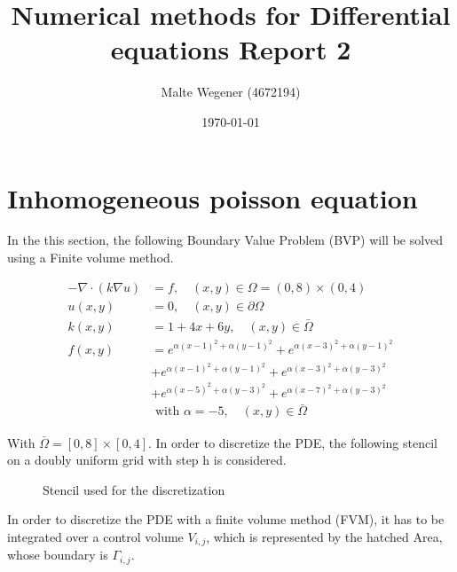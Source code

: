 \documentclass{article}
\title{Numerical methods for Differential equations Report 2}
\author{Malte Wegener (4672194)}
\date{\today}
\begin{document}
\maketitle
\section{Inhomogeneous poisson equation}
In the this section, the following Boundary Value Problem (BVP) will be solved using a Finite volume method.

\begin{equation}
\begin{aligned}-\nabla \cdot(k \nabla u) &=f, \quad(x, y) \in \Omega=(0,8) \times(0,4) \\ u(x, y) &=0, \quad(x, y) \in \partial \Omega \\ k(x, y) &=1+4 x+6 y, \quad(x, y) \in \bar{\Omega} \\ f(x, y) &=e^{\alpha(x-1)^{2}+\alpha(y-1)^{2}}+e^{\alpha(x-3)^{2}+\alpha(y-1)^{2}} \\ &+e^{\alpha(x-1)^{2}+\alpha(y-1)^{2}}+e^{\alpha(x-3)^{2}+\alpha(y-3)^{2}} \\ &+e^{\alpha(x-5)^{2}+\alpha(y-3)^{2}}+e^{\alpha(x-7)^{2}+\alpha(y-3)^{2}} \\ & \text { with } \alpha=-5, \quad(x, y) \in \bar{\Omega} \end{aligned}
\end{equation}

With $\bar{\Omega}=[0,8] \times[0,4]$. In order to discretize the PDE, the following stencil on a doubly uniform grid with step h is considered.
\begin{figure}[H]
	\centering
	\caption{Stencil used for the discretization}
\end{figure} 
In order to discretize the PDE with a finite volume method (FVM), it has to be integrated over a control volume $V_{i,j}$, which is represented by the hatched Area, whose boundary is $\Gamma_{i,j}$.
\end{document}
